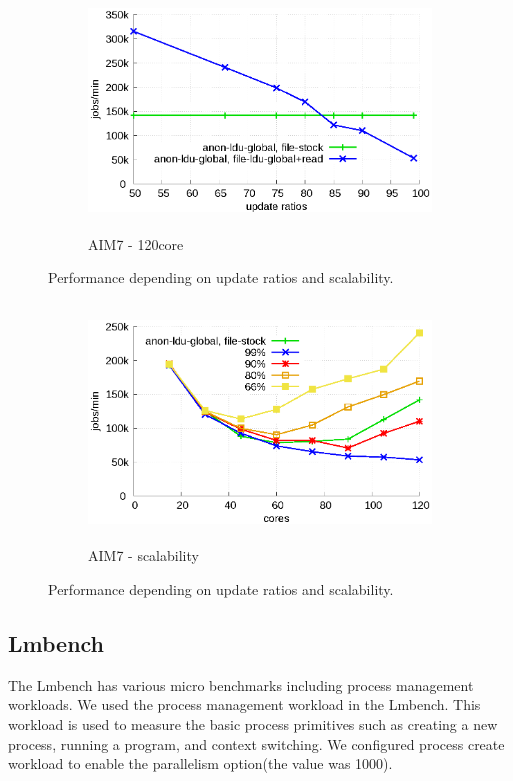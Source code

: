 \begin{figure}[t!]
    \centering
    \begin{subfigure}[b]{1\textwidth}
  \begin{center}
        \includegraphics[height=2.5in]{graph/ratio_lmbench.eps}
        \caption{AIM7 - 120core}
  \end{center}
    \end{subfigure}%
    \caption{Performance depending on update ratios and scalability.}
    \label{fig:UpdateRate_lmbench}
\end{figure}

\begin{figure}[t!]
    \centering
    \begin{subfigure}[b]{1\textwidth}
        \includegraphics[height=2.5in]{graph/ratio_lmbench_core.eps}
        \caption{AIM7 - scalability}
    \end{subfigure}%
    \caption{Performance depending on update ratios and scalability.}
    \label{fig:UpdateRate_lmbench_2}
\end{figure}


\subsection{Lmbench}
The Lmbench has various micro benchmarks including process management workloads.
We used the process management workload in the Lmbench.
This workload is used to measure the basic process primitives such as creating a
new process, running a program, and context switching.
We configured process create workload to enable the parallelism option(the
value was 1000).

